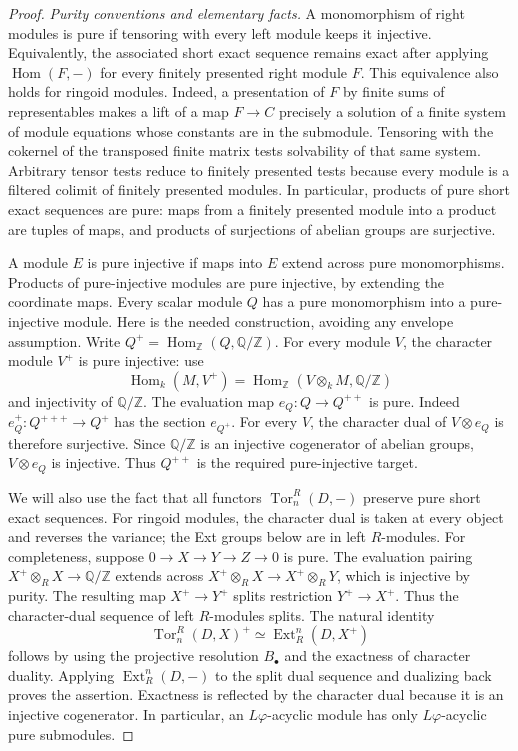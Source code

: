 \begin{proof}
\emph{Purity conventions and elementary facts.}
A monomorphism of right modules is pure if tensoring with every
left module keeps it injective. Equivalently, the associated short
exact sequence remains exact after applying $\operatorname{Hom}(F,-)$
for every finitely presented right module $F$.
This equivalence also holds for ringoid modules. Indeed, a presentation
of $F$ by finite sums of representables makes a lift of a map
$F\to C$ precisely a solution of a finite system of module equations
whose constants are in the submodule. Tensoring with the cokernel
of the transposed finite matrix tests solvability of that same system.
Arbitrary tensor tests reduce to finitely presented tests because
every module is a filtered colimit of finitely presented modules.
In particular, products of pure short exact sequences are pure:
maps from a finitely presented module into a product are tuples of
maps, and products of surjections of abelian groups are surjective.

A module $E$ is pure injective if maps into $E$ extend across pure
monomorphisms. Products of pure-injective modules are pure injective,
by extending the coordinate maps. Every scalar module $Q$ has a
pure monomorphism into a pure-injective module. Here is the needed
construction, avoiding any envelope assumption. Write
$Q^+=\operatorname{Hom}_{\mathbb Z}(Q,\mathbb Q/\mathbb Z)$.
For every module $V$, the character module $V^+$ is pure injective:
use
\[
 \operatorname{Hom}_k(M,V^+)
   =\operatorname{Hom}_{\mathbb Z}(V\otimes_k M,\mathbb Q/\mathbb Z)
\]
and injectivity of $\mathbb Q/\mathbb Z$.
The evaluation map $e_Q:Q\to Q^{++}$ is pure.
Indeed $e_Q^+:Q^{+++}\to Q^+$ has the section $e_{Q^+}$.
For every $V$, the character dual of $V\otimes e_Q$ is therefore
surjective. Since $\mathbb Q/\mathbb Z$ is an injective cogenerator
of abelian groups, $V\otimes e_Q$ is injective. Thus $Q^{++}$ is
the required pure-injective target.

We will also use the fact that all functors
$\operatorname{Tor}_n^R(D,-)$ preserve pure short exact sequences.
For ringoid modules, the character dual is taken at every object
and reverses the variance; the Ext groups below are in left
$R$-modules.
For completeness, suppose $0\to X\to Y\to Z\to0$ is pure.
The evaluation pairing
$X^+\otimes_R X\to\mathbb Q/\mathbb Z$ extends across
$X^+\otimes_R X\to X^+\otimes_R Y$, which is injective by purity.
The resulting map $X^+\to Y^+$ splits restriction
$Y^+\to X^+$. Thus the character-dual sequence of left
$R$-modules splits.
The natural identity
\[
 \operatorname{Tor}_n^R(D,X)^+
   \simeq \operatorname{Ext}_R^n(D,X^+)
 \tag{SM24.4}
\]
follows by using the projective resolution $B_\bullet$ and the
exactness of character duality.
Applying $\operatorname{Ext}_R^n(D,-)$ to the split dual sequence
and dualizing back proves the assertion. Exactness is reflected
by the character dual because it is an injective cogenerator.
In particular, an $L\varphi$-acyclic module has only
$L\varphi$-acyclic pure submodules.


\end{proof}
